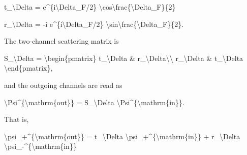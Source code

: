 \documentclass[
]{article}
\newenvironment{Shaded}{}{}
\newcommand{\NormalTok}[1]{#1}
\begin{document}
\begin{Shaded}
\begin{Highlighting}[]
\NormalTok{t\_\textbackslash{}Delta}
\NormalTok{=}
\NormalTok{e\^{}\{i\textbackslash{}Delta\_F/2\}}
\NormalTok{\textbackslash{}cos\textbackslash{}frac\{\textbackslash{}Delta\_F\}\{2\}}
\end{Highlighting}
\end{Shaded}

\begin{Shaded}
\begin{Highlighting}[]
\NormalTok{r\_\textbackslash{}Delta}
\NormalTok{=}
\NormalTok{{-}i e\^{}\{i\textbackslash{}Delta\_F/2\}}
\NormalTok{\textbackslash{}sin\textbackslash{}frac\{\textbackslash{}Delta\_F\}\{2\}.}
\end{Highlighting}
\end{Shaded}

The two-channel scattering matrix is

\begin{Shaded}
\begin{Highlighting}[]
\NormalTok{S\_\textbackslash{}Delta}
\NormalTok{=}
\NormalTok{\textbackslash{}begin\{pmatrix\}}
\NormalTok{t\_\textbackslash{}Delta \& r\_\textbackslash{}Delta\textbackslash{}\textbackslash{}}
\NormalTok{r\_\textbackslash{}Delta \& t\_\textbackslash{}Delta}
\NormalTok{\textbackslash{}end\{pmatrix\},}
\end{Highlighting}
\end{Shaded}

and the outgoing channels are read as

\begin{Shaded}
\begin{Highlighting}[]
\NormalTok{\textbackslash{}Psi\^{}\{\textbackslash{}mathrm\{out\}\}}
\NormalTok{=}
\NormalTok{S\_\textbackslash{}Delta}
\NormalTok{\textbackslash{}Psi\^{}\{\textbackslash{}mathrm\{in\}\}.}
\end{Highlighting}
\end{Shaded}

That is,

\begin{Shaded}
\begin{Highlighting}[]
\NormalTok{\textbackslash{}psi\_+\^{}\{\textbackslash{}mathrm\{out\}\}}
\NormalTok{=}
\NormalTok{t\_\textbackslash{}Delta \textbackslash{}psi\_+\^{}\{\textbackslash{}mathrm\{in\}\}}
\NormalTok{+}
\NormalTok{r\_\textbackslash{}Delta \textbackslash{}psi\_{-}\^{}\{\textbackslash{}mathrm\{in\}\}}
\end{Highlighting}
\end{Shaded}
\end{document}
